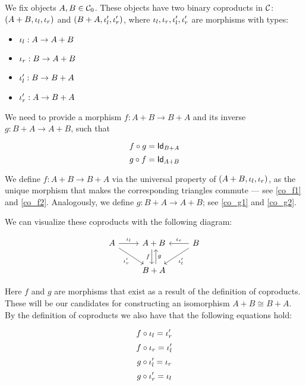 \begin{solution}\label{sol:swap_binary_coproduct}
We fix objects $A,B\in{\mathcal{C}}_0$. These objects have two binary coproducts in $\mathcal{C}$: $(A+B,\iota_l,\iota_r)$ and $(B+A,\iota_l',\iota_r')$, where $\iota_l,\iota_r,\iota_l',\iota_r'$ are morphisms with types:

\begin{itemize}
    \item $\iota_l:A \to A+B$
    \item $\iota_r:B \to A+B$
    \item $\iota_l':B \to B+A$ 
    \item $\iota_r':A \to B+A$
\end{itemize}

We need to provide a morphism $f:A+B \to B+A$ and its inverse $g:B+A \to A+B$, such that

\begin{equation}
\label{unit1}
    \co {g} {f} = \Id[B+A]
\end{equation}
\begin{equation}
\label{unit2}
    \co {f} {g} = \Id[A+B]
\end{equation}

We define $f : A + B \to B + A$ via the universal property of $(A + B, \iota_l, \iota_r)$, as the unique morphism that makes the corresponding triangles commute --- see \eqref{co_f1} and \eqref{co_f2}.
Analogously, we define $g : B + A \to A + B$; see \eqref{co_g1} and \eqref{co_g2}.

\noindent
We can visualize these coproducts with the following diagram:

\[
\begin{tikzcd}
A \arrow[r, "\inl"] \arrow[rd, "\inr'"'] & A+B \arrow[d, "f"', shift right] & B \arrow[l, "\inr"'] \arrow[ld, "\inl'"] \\
                                      & B+A \arrow[u, "g"', shift right] &                                       
\end{tikzcd}
\]

\noindent
Here $f$ and $g$ are morphisms that exist as a result of the definition of coproducts. These will be our candidates for constructing an isomorphism $A+B\cong B+A$. By the definition of coproducts we also have that the following equations hold:

\begin{equation}
\label{co_f1}
    \co {\inl} {f} = \inr'
\end{equation}
\begin{equation}
\label{co_f2}
    \co {\inr} {f} = \inl'
\end{equation}
\begin{equation}
\label{co_g1}
    \co {\inl'} {g} = \inr
\end{equation}
\begin{equation}
\label{co_g2}
    \co {\inr'} {g} = \inl
\end{equation}


\end{solution}
